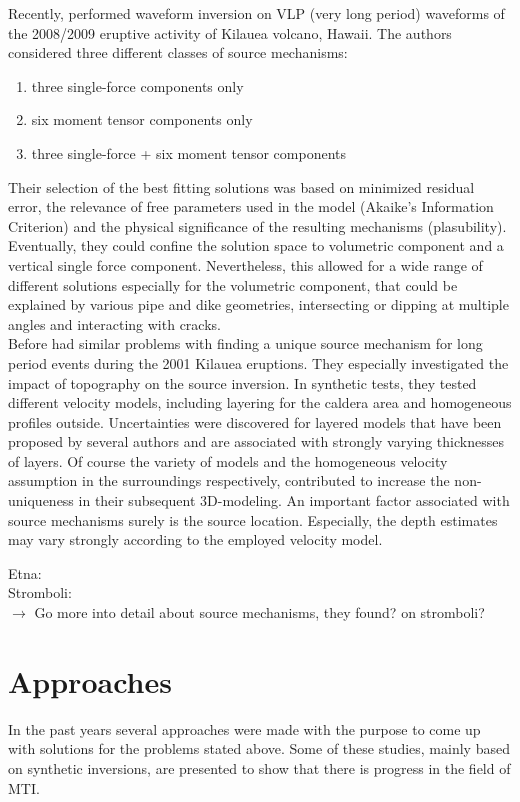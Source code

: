 \documentclass[12pt, a4paper]{article}
\newcommand{\changed}[1]{ {\color{red} #1} }
\begin{document}
Recently, \citet{Chouet2010} performed waveform inversion on VLP (very long period) waveforms of the 2008/2009 eruptive activity of Kilauea volcano, Hawaii. The authors considered three different classes of source mechanisms:
\begin{enumerate}
	\singlespacing
	\item three single-force components only
	\item six moment tensor components only
	\item three single-force + six moment tensor components
\end{enumerate} 
Their selection of the best fitting solutions was based on minimized residual error, the relevance of free parameters used in the model (Akaike's Information Criterion) and the physical significance of the resulting mechanisms (plasubility). Eventually, they could confine the solution space to volumetric component and a vertical single force component. Nevertheless, this allowed for a wide range of different solutions especially for the volumetric component, that could be explained by various pipe and dike geometries, intersecting or dipping at multiple angles and interacting with cracks.\\
Before \citet{Cesca2008} had similar problems with finding a unique source mechanism for long period events during the 2001 Kilauea eruptions. They especially investigated the impact of topography on the source inversion. In synthetic tests, they tested different velocity models, including layering for the caldera area and homogeneous profiles outside. Uncertainties were discovered for layered models that have been proposed by several authors and are associated with strongly varying thicknesses of layers. Of course the variety of models and the homogeneous velocity assumption in the surroundings respectively, contributed to increase the non-uniqueness in their subsequent 3D-modeling.
An important factor associated with source mechanisms surely is the source location. Especially, the depth estimates may vary strongly according to the employed velocity model. 

Etna: \citet{Cannata2009, DeBarros2011}\\
Stromboli: \citet{Chouet1997, Chouet2003, Auger2006}\\


$\rightarrow$ \changed{Go more into detail about source mechanisms, they found? on stromboli?}


\section*{Approaches}
In the past years several approaches were made with the purpose to come up with solutions for the problems stated above. Some of these studies, mainly based on synthetic inversions, are presented to show that there is progress in the field of MTI. 
\end{document}
